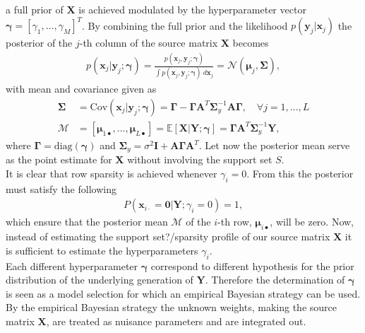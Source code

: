 a full prior of $\mathbf{X}$ is achieved modulated by the hyperparameter vector $\boldsymbol{\gamma} = [\gamma_1, \dots, \gamma_M]^T$. By combining the full prior and the likelihood $p(\mathbf{y}_{j} \vert \mathbf{x}_{j})$ the posterior of the $j$-th column of the source matrix $\mathbf{X}$ becomes
\begin{align*}
p(\mathbf{x}_{j} \vert \mathbf{y}_{j} ; \boldsymbol{\gamma}) = \frac{p(\mathbf{x}_{j}, \mathbf{y}_{j} ; \boldsymbol{\gamma})}{\int p(\mathbf{x}_{j}, \mathbf{y}_{j} ; \boldsymbol{\gamma}) \ d \mathbf{x}_{j}} = \mathcal{N}(\boldsymbol{\mu}_{j}, \boldsymbol{\Sigma}),
\end{align*}
with mean and covariance given as
\begin{align}
\boldsymbol{\Sigma} &= \text{Cov}(\mathbf{x}_{j} \vert \mathbf{y}_{j} ; \boldsymbol{\gamma}) = \boldsymbol{\Gamma} - \boldsymbol{\Gamma} \mathbf{A}^T \boldsymbol{\Sigma}_y^{-1} \mathbf{A} \boldsymbol{\Gamma}, \quad \forall j = 1, \dots, L \nonumber \\
\mathcal{M} &= [\boldsymbol{\mu}_{1 \bullet}, \dots, \boldsymbol{\mu}_{ L \bullet}] = \mathbb{E}[\mathbf{X} \vert \mathbf{Y} ; \boldsymbol{\gamma}] = \boldsymbol{\Gamma} \mathbf{A}^T \boldsymbol{\Sigma}_y^{-1} \mathbf{Y}, \label{eq:moments}
\end{align}
where $\boldsymbol{\Gamma} = \text{diag}(\boldsymbol{\gamma})$ and $\boldsymbol{\Sigma}_y = \sigma^2 \mathbf{I} + \mathbf{A} \boldsymbol{\Gamma} \mathbf{A}^T$. Let now the posterior mean serve as the point estimate for $\mathbf{X}$ without involving the support set $S$.
\\
It is clear that row sparsity is achieved whenever $\gamma_i = 0$. From this the posterior must satisfy the following 
\begin{align*}
P(\mathbf{x}_{i \cdot} = \mathbf{0} \vert \mathbf{Y} ; \gamma_i = 0) = 1,
\end{align*}
which ensure that the posterior mean $\mathcal{M}$ of the $i$-th row, $\boldsymbol{\mu}_{i \bullet}$, will be zero. Now, instead of estimating the support set?/sparsity profile of our source matrix $\mathbf{X}$ it is sufficient to estimate the hyperparameters $\gamma_i$\cite[p. 147]{phd_wipf}.
\\
Each different hyperparameter $\boldsymbol{\gamma}$ correspond to different hypothesis for the prior distribution of the underlying generation of $\mathbf{Y}$. Therefore the determination of $\boldsymbol{\gamma}$ is seen as a model selection for which an empirical Bayesian strategy can be used. By the empirical Bayesian strategy the unknown weights, making the source matrix $\textbf{X}$, are treated as nuisance parameters and are integrated out.
